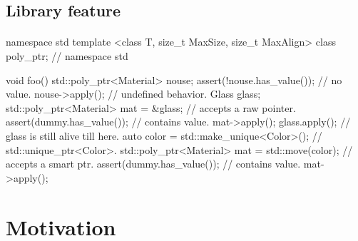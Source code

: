 \documentclass{article}
\begin{document}
\subsection{Library feature}
\paragraph{}
\begin{codeblock}
namespace std {
template <class T, size_t MaxSize, size_t MaxAlign>
class poly_ptr;
} // namespace std

void foo() {
  {
    std::poly_ptr<Material> nouse;
    assert(!nouse.has_value()); // no value.
    nouse->apply(); // undefined behavior.
  }
  {
    Glass glass;
    {
      std::poly_ptr<Material> mat = &glass; // accepts a raw pointer.
      assert(dummy.has_value()); // contains value.
      mat->apply();
    }
    glass.apply(); // glass is still alive till here.
  }
  {
    auto color = std::make_unique<Color>(); // std::unique\_ptr\textless Color\textgreater.
    std::poly_ptr<Material> mat = std::move(color); // accepts a smart ptr.
    assert(dummy.has_value()); // contains value.
    mat->apply();
  }
}
\end{codeblock}

\section{Motivation}
\end{document}
